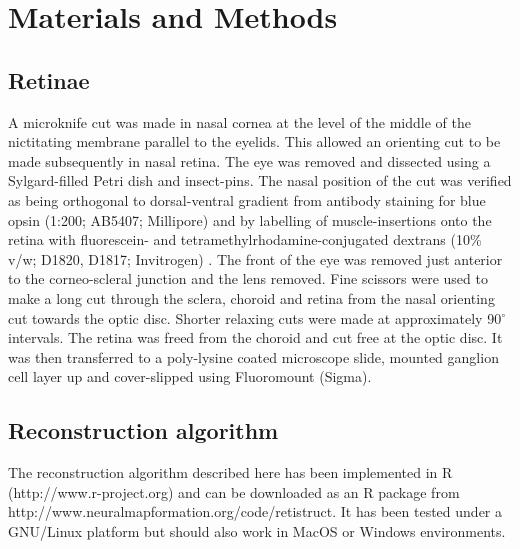 \documentclass[10pt]{article}
\begin{document}

\section*{Materials and Methods}
\label{retistruct_plos:sec:materials-methods}

\subsection*{Retinae}
\label{retistruct_plos:sec:retinae}

A microknife cut was made in nasal cornea at the level of the middle
of the nictitating membrane parallel to the eyelids. This allowed an
orienting cut to be made subsequently in nasal retina. The eye was
removed and dissected using a Sylgard-filled Petri dish and
insect-pins. The nasal position of the cut was verified as being
orthogonal to dorsal-ventral gradient from antibody staining for blue
opsin (1:200; AB5407; Millipore) and by labelling of muscle-insertions
onto the retina with fluorescein- and tetramethylrhodamine-conjugated
dextrans (10\% v/w; D1820, D1817; Invitrogen)
. The front of the eye was
removed just anterior to the corneo-scleral junction and the lens
removed. Fine scissors were used to make a long cut through the
sclera, choroid and retina from the nasal orienting cut towards the
optic disc. Shorter relaxing cuts were made at approximately
90$^\circ$ intervals. The retina was freed from the choroid and cut
free at the optic disc. It was then transferred to a poly-lysine
coated microscope slide, mounted ganglion cell layer up and
cover-slipped using Fluoromount (Sigma).

\subsection*{Reconstruction algorithm}
\label{retistruct_plos:sec:reconstr-algor}

The reconstruction algorithm described here has been implemented in R
(http://www.r-project.org) and can be downloaded as an R package from
http://www.neuralmapformation.org/code/retistruct. It has been tested
under a GNU/Linux platform but should also work in MacOS or Windows
environments.
\end{document}
